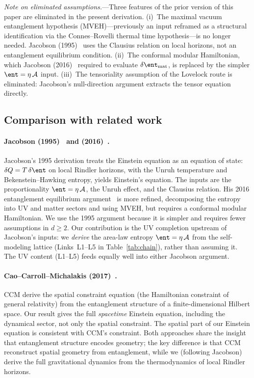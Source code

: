 \emph{Note on eliminated assumptions.}---Three features of the prior
version of this paper are eliminated in the present derivation.  (i)~The
maximal vacuum entanglement hypothesis (MVEH)---previously an input
reframed as a structural identification via the Connes--Rovelli thermal
time hypothesis---is no longer needed.  Jacobson
(1995)~\cite{Jacobson1995} uses the Clausius relation on local horizons,
not an entanglement equilibrium condition.  (ii)~The conformal modular
Hamiltonian, which Jacobson (2016)~\cite{Jacobson2016} required to
evaluate $\delta\ent_{\mathrm{mat}}$, is replaced by the simpler
$\ent = \eta\,\mathcal{A}$ input.  (iii)~The tensoriality assumption of
the Lovelock route is eliminated: Jacobson's null-direction argument
extracts the tensor equation directly.

\subsection{Comparison with related work}
\label{sec:comparison}

\paragraph{Jacobson (1995)~\cite{Jacobson1995} and (2016)~\cite{Jacobson2016}.}
Jacobson's 1995 derivation treats the Einstein equation as an equation of
state: $\delta Q = T\,\delta\ent$ on local Rindler horizons, with the
Unruh temperature and Bekenstein--Hawking entropy, yields Einstein's
equation.  The inputs are the proportionality $\ent = \eta\,\mathcal{A}$,
the Unruh effect, and the Clausius relation.  His 2016 entanglement
equilibrium argument~\cite{Jacobson2016} is more refined, decomposing
the entropy into UV and matter sectors and using MVEH, but requires a
conformal modular Hamiltonian.  We use the 1995 argument because it is
simpler and requires fewer assumptions in $d \geq 2$.  Our contribution
is the UV completion upstream of Jacobson's inputs: we \emph{derive} the
area-law entropy $\ent = \eta\,\mathcal{A}$ from the self-modeling
lattice (Links~L1--L5 in Table~\ref{tab:chain}), rather than assuming
it.  The UV content (L1--L5) feeds equally well into either Jacobson
argument.

\paragraph{Cao--Carroll--Michalakis (2017)~\cite{CCM2017}.}
CCM derive the spatial constraint equation (the Hamiltonian constraint of
general relativity) from the entanglement structure of a
finite-dimensional Hilbert space.  Our result gives the full
\emph{spacetime} Einstein equation, including the dynamical sector, not
only the spatial constraint.  The spatial part of our Einstein equation is
consistent with CCM's constraint.  Both approaches share the insight that
entanglement structure encodes geometry; the key difference is that CCM
reconstruct spatial geometry from entanglement, while we (following
Jacobson) derive the full gravitational dynamics from the thermodynamics
of local Rindler horizons.

